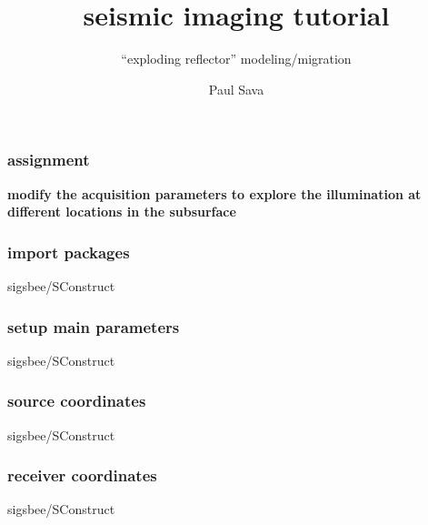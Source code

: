 
\title[]{seismic imaging tutorial}
\subtitle{``exploding reflector'' modeling/migration}
\author[]{Paul Sava}
\date{}
\large

\def\big#1{\begin{center} \LARGE \textbf{#1} \end{center}}

 { \cwpcover }


\begin{frame} \frametitle{assignment}

\big{modify the acquisition parameters to explore the illumination at
different locations in the subsurface}

\end{frame}
\cwpnote{}
\lstset{language=python,showstringspaces=false}

\begin{frame} \frametitle{import packages}
\normalsize 

		{sigsbee/SConstruct}
\end{frame}
\cwpnote{}

\begin{frame} \frametitle{setup main parameters}
\normalsize 

		{sigsbee/SConstruct}
\end{frame}
\cwpnote{}

\begin{frame} \frametitle{source coordinates}
\normalsize 

		{sigsbee/SConstruct}
\end{frame}
\cwpnote{}

\begin{frame} \frametitle{receiver coordinates}
\normalsize 

		{sigsbee/SConstruct}
\end{frame}
\cwpnote{}

